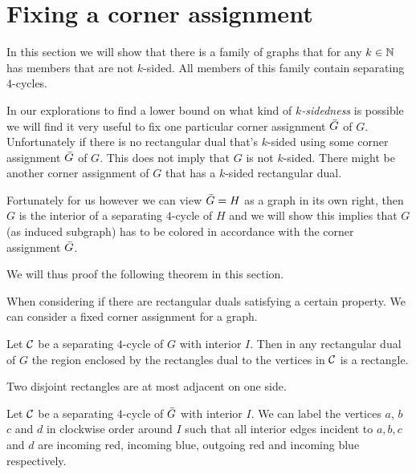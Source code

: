 
\section{Fixing a corner assignment}
  \label{s:fix}
  In this section we will show that there is a family of graphs that for any $k \in \mathbb{N}$ has members that are not $k$-sided. All members of this family contain separating $4$-cycles.

  In our explorations to find a lower bound on what kind of \emph{$k$-sidedness} is possible we will find it very useful to fix one particular corner assignment $\bar{G}$ of $G$. Unfortunately if there is no rectangular dual that's $k$-sided using some corner assignment $\bar{G}$ of $G$. This does not imply that $G$ is not $k$-sided. There might be another corner assignment of $G$ that has a $k$-sided rectangular dual.

  Fortunately for us however we can view $\bar{G} = H$ as a graph in its own right, then $G$ is the interior of a separating $4$-cycle of $H$ and we will show this implies that $G$ (as induced subgraph) has to be colored in accordance with the corner assignment $\bar{G}$.

  We will thus proof the following theorem in this section.
  \begin{thrm}
  \label{th:fixCorner assignment}
  When considering if there are rectangular duals satisfying a certain property. We can consider a fixed corner assignment for a graph.
  \end{thrm}

  \begin{remark}
  \label{re:interiorRectangle}
  Let $\mathcal{C}$ be a separating $4$-cycle of $G$ with interior $I$. Then in any rectangular dual of $G$ the region enclosed by the rectangles dual to the vertices in $\mathcal{C}$ is a rectangle.
  \end{remark}

  \begin{remark}
  \label{re:disjointRectanglesOnlyHaveOneAdjecentSide}
  Two disjoint rectangles are at most adjacent on one side.
  \end{remark}

  \begin{lemma}
  \label{lm:fix:fourCycleInteriorColor}
  Let $\mathcal{C}$ be a separating $4$-cycle of $\bar{G}$ with interior $I$. We can label the vertices $a$, $b$ $c$ and $d$ in clockwise order around $I$ such that all interior edges incident to $a, b, c$ and $d$ are incoming red, incoming blue, outgoing red and  incoming blue respectively.
  \end{lemma}

